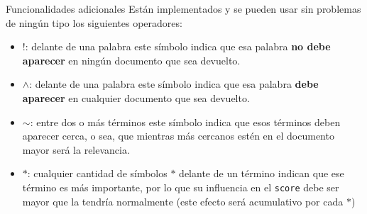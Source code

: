 \documentclass{beamer}
\begin{document}
\begin{frame}{Funcionalidades adicionales}
  Están implementados y se pueden usar sin problemas de ningún tipo los siguientes operadores:

  \begin{itemize}[<+->]
    \item $!$: delante de una palabra este símbolo indica que esa palabra {\bf no debe aparecer} en ningún documento que sea devuelto.
    \item $\wedge $: delante de una palabra este símbolo indica que esa palabra {\bf debe aparecer} en cualquier documento que sea devuelto.
    \item $\sim$: entre dos o más términos este símbolo indica que esos términos deben aparecer cerca, o sea, que mientras más cercanos estén en el documento mayor será la relevancia.
    \item $*$: cualquier cantidad de símbolos $*$ delante de un término indican que ese término es más importante, por lo que su influencia en el {\tt score} debe ser mayor que la tendría normalmente (este efecto será acumulativo por cada $*$)
  \end{itemize}
\end{frame}
\end{document}

